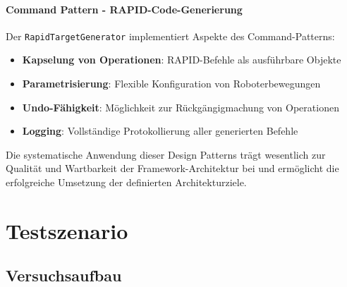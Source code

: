 \paragraph{Command Pattern - RAPID-Code-Generierung}
Der \texttt{RapidTargetGenerator} implementiert Aspekte des Command-Patterns:

\begin{itemize}
    \item \textbf{Kapselung von Operationen}: RAPID-Befehle als ausführbare Objekte
    \item \textbf{Parametrisierung}: Flexible Konfiguration von Roboterbewegungen
    \item \textbf{Undo-Fähigkeit}: Möglichkeit zur Rückgängigmachung von Operationen
    \item \textbf{Logging}: Vollständige Protokollierung aller generierten Befehle
\end{itemize}

Die systematische Anwendung dieser Design Patterns trägt wesentlich zur
Qualität und Wartbarkeit der Framework-Architektur bei und ermöglicht die
erfolgreiche Umsetzung der definierten Architekturziele.

\section{Testszenario}
\subsection{Versuchsaufbau}
